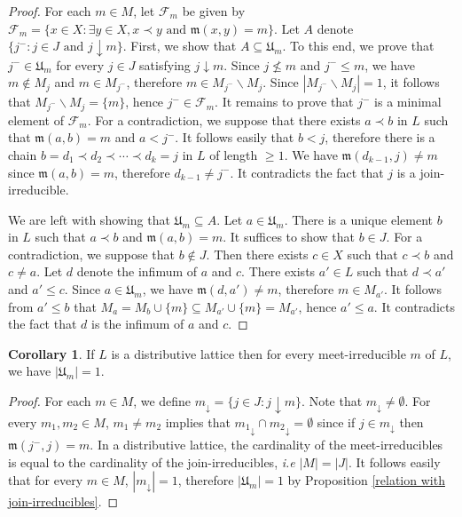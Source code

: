 \documentclass{article}
\theoremstyle{definition}
\newtheorem{coro}{Corollary}
\newcommand\meetirrdiff[2]{\mathfrak{m}(#1,#2)}
\newcommand\set[1]{\{ #1 \}}
\begin{document}
\begin{proof}
For each $m\in M$, let $\mathcal{F}_m$ be given by $\mathcal{F}_m=\set{x \in X: \exists y \in X, x \prec y \text{ and }\meetirrdiff{x}{y}=m}$.  Let $A$ denote $\set{j^{-}: j \in J \text{ and } j\downarrow m}$. First, we show that $A \subseteq \mathfrak{U}_m$. To this end, we prove that $j^{-}\in \mathfrak{U}_m$ for every $j \in J$ satisfying $j \downarrow m$.  Since $j \not \leq m$ and $j^{-} \leq m$, we have $ m \not \in M_{j}$ and $m \in M_{j^{-}}$, therefore $m \in M_{j^{-}}\backslash M_{j}$. Since $|M_{j^{-}}\backslash M_{j}|=1$, it follows that $M_{j^{-}}\backslash M_{j}=\set{m}$, hence $j^{-} \in \mathcal{F}_m$. It remains to prove that $j^{-}$  is a minimal element of $\mathcal{F}_m$. For a contradiction, we suppose that there exists $a \prec b$ in $L$ such that $\meetirrdiff{a}{b}=m$ and $a<j^{-}$. It follows easily that $b < j$, therefore there is a chain $b=d_1\prec d_2\prec \cdots \prec d_k=j$ in $L$ of length $\geq 1$. We have $\meetirrdiff{d_{k-1}}{j}\neq m$ since $\meetirrdiff{a}{b}=m$, therefore $d_{k-1}\neq j^{-}$. It contradicts the fact that $j$ is a join-irreducible. 

We are left with showing that $\mathfrak{U}_m \subseteq A$. Let $a \in \mathfrak{U}_m$. There is a unique element $b$ in $L$ such that $a \prec b$ and $\meetirrdiff{a}{b}=m$. It suffices to show that $b \in J$. For a contradiction, we suppose that $b \not \in J$. Then there exists $c \in X$ such that $c \prec b$ and $c \neq a$. Let $d$ denote the infimum of $a$ and $c$. There exists $a'\in L$ such that $d \prec a'$ and $a' \leq c$. Since $a \in \mathfrak{U}_m$, we have $\meetirrdiff{d}{a'}\neq m$, therefore $m \in M_{a'}$. It follows from $a' \leq b$ that $M_a=M_b \cup \set{m} \subseteq M_{a'} \cup \set{m}=M_{a'}$, hence $a' \leq a$. It contradicts the fact that $d$ is the infimum of $a$ and $c$.
\end{proof}
\begin{coro}
\label{uniqueness of join-irreducibles}
If $L$ is a distributive lattice then for every meet-irreducible $m$ of $L$, we have $|\mathfrak{U}_m|=1$. 
\end{coro}
\begin{proof}
For each $m \in M$, we define $m_{\downarrow}=\set{j \in J: j \downarrow m}$. Note that $m_{\downarrow}\neq \emptyset$. For every $m_1,m_2\in M$, $m_1\neq m_2$ implies that ${m_1}_{\downarrow}\cap {m_2}_{\downarrow} =\emptyset$  since if $j \in m_{\downarrow}$ then $ \meetirrdiff{j^{-}}{j}=m$. In a distributive lattice, the cardinality of the meet-irreducibles is equal to the cardinality of the join-irreducibles, \emph{i.e} $|M|=|J|$. It follows easily that for every $m\in M$, $|m_{{\downarrow}}|=1$, therefore $|\mathfrak{U}_m|=1$ by Proposition \ref{relation with join-irreducibles}.
\end{proof}
\end{document}
